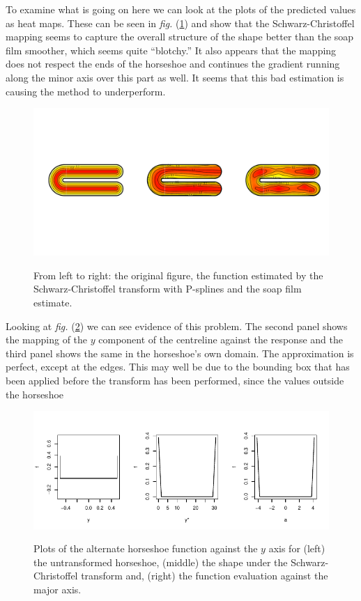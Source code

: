 \documentclass[a4paper,10pt]{amsart}
\newcommand{\sch}{Schwarz-Christoffel }
\newcommand{\fig}[1]{\emph{fig.} (\ref{#1})}
\begin{document}
To examine what is going on here we can look at the plots of the predicted values as heat maps. These can be seen in \fig{altramsaycomp} and show that the \sch mapping seems to capture the overall structure of the shape better than the soap film smoother, which seems quite ``blotchy.'' It also appears that the mapping does not respect the ends of the horseshoe and continues the gradient running along the minor axis over this part as well. It seems that this bad estimation is causing the method to underperform. 


\begin{figure}
\centering
\includegraphics[width=5in, trim=2in 2in 1in 2.5in]{figs/altramsaycomp.pdf}\\
\caption{From left to right: the original figure, the function estimated by the \sch transform with P-splines and the soap film estimate.}
\label{altramsaycomp}
\end{figure}

Looking at \fig{altcentrelinelineplot} we can see evidence of this problem. The second panel shows the mapping of the $y$ component of the centreline against the response and the third panel shows the same in the horseshoe's own domain. The approximation is perfect, except at the edges. This may well be due to the bounding box that has been applied before the transform has been performed, since the values outside the horseshoe 

\begin{figure}
\centering
\includegraphics[trim=0in 0in 0in 0in]{figs/altcentrelinelineplots.pdf} \\
\caption{Plots of the alternate horseshoe function against the $y$ axis for (left) the untransformed horseshoe, (middle) the shape under the \sch transform and, (right) the function evaluation against the major axis.}
\label{altcentrelinelineplot}
\end{figure}
\end{document}
